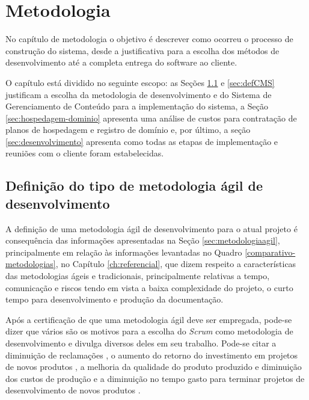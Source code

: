 \chapter{Metodologia}
\label{ch:metodologia}

\hspace{2.5cm}

No capítulo de metodologia o objetivo é descrever como ocorreu o processo de construção do sistema, desde a justificativa para a escolha dos métodos de desenvolvimento até a completa entrega do software ao cliente. 

O capítulo está dividido no seguinte escopo: as Seções \ref{sec:defMetodologia} e \ref{sec:defCMS} justificam a escolha da metodologia de desenvolvimento e do Sistema de Gerenciamento de Conteúdo para a implementação do sistema, a Seção \ref{sec:hospedagem-dominio} apresenta uma análise de custos para contratação de planos de hospedagem e registro de domínio e, por último, a seção \ref{sec:desenvolvimento} apresenta como todas as etapas de implementação e reuniões com o cliente foram estabelecidas.

\hspace{2.5cm}

\section{Definição do tipo de metodologia ágil de desenvolvimento}
\label{sec:defMetodologia}

\hspace{2.5cm}

A definição de uma metodologia ágil de desenvolvimento para o atual projeto é consequência das informações apresentadas na Seção \ref{sec:metodologiaagil}, principalmente em relação às informações levantadas no Quadro \ref{comparativo-metodologias}, no Capítulo \ref{ch:referencial}, que dizem respeito a características das metodologias ágeis e tradicionais, principalmente relativas a tempo, comunicação e riscos tendo em vista a baixa complexidade do projeto, o curto tempo para desenvolvimento e produção da documentação.

Após a certificação de que uma metodologia ágil deve ser empregada, pode-se dizer que vários são os motivos para a escolha do \textit{Scrum} como metodologia de desenvolvimento e  divulga diversos deles em seu trabalho. Pode-se citar a diminuição de reclamações , o aumento do retorno do investimento em projetos de novos produtos , a melhoria da qualidade do produto produzido e diminuição dos custos de produção  e a diminuição no tempo gasto para terminar projetos de desenvolvimento de novos produtos .

